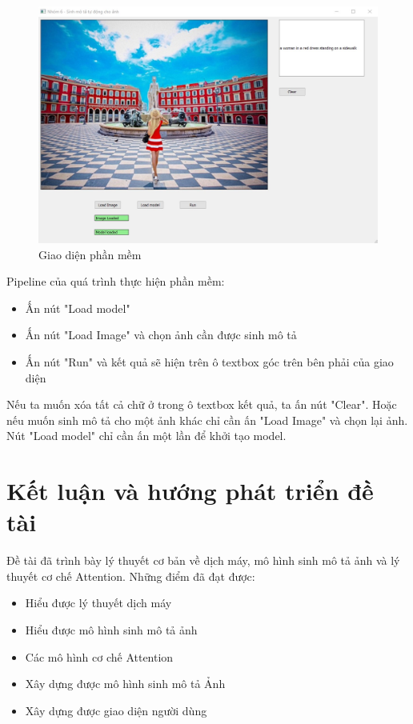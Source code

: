 \documentclass[14pt, a4paper]{article}
\numberwithin{equation}{section}
\numberwithin{algorithm}{section}
\numberwithin{figure}{section}
\numberwithin{table}{section}
\numberwithin{dl}{section}
\numberwithin{md}{section}
\numberwithin{bd}{section}
\numberwithin{dn}{section}
\numberwithin{hq}{section}
\begin{document}
    \begin{figure}[h!] \centering

        \includegraphics[scale=0.5]{UI.jpg}
        \caption{Giao diện phần mềm}
        \label{fig:UI}

    \end{figure}

    Pipeline của quá trình thực hiện phần mềm:

    \begin{itemize}
        \item Ấn nút "Load model"
        \item Ấn nút "Load Image" và chọn ảnh cần được sinh mô tả
        \item Ấn nút "Run" và kết quả sẽ hiện trên ô textbox góc trên bên phải của giao diện
    \end{itemize}

    Nếu ta muốn xóa tất cả chữ ở trong ô textbox kết quả, ta ấn nút "Clear". 
    Hoặc nếu muốn sinh mô tả cho một ảnh khác chỉ cần ấn "Load Image" và chọn lại ảnh. 
    Nút "Load model" chỉ cần ấn một lần để khởi tạo model.

    \section{Kết luận và hướng phát triển đề tài}

    Đề tài đã trình bày lý thuyết cơ bản về dịch máy, mô hình sinh mô tả ảnh và lý thuyết cơ chế Attention.
    Những điểm đã đạt được:

    \begin{itemize}
        \item Hiểu được lý thuyết dịch máy
        \item Hiểu được mô hình sinh mô tả ảnh
        \item Các mô hình cơ chế Attention
        \item Xây dựng được mô hình sinh mô tả Ảnh
        \item Xây dựng được giao diện người dùng
    \end{itemize}
\end{document}

